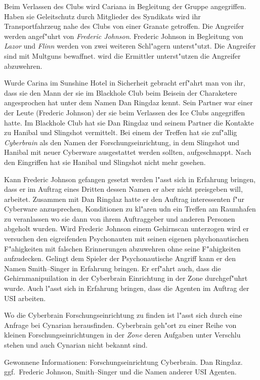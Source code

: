 Beim Verlassen des Clubs wird Cariana in Begleitung der Gruppe angegriffen. Haben sie Geleitschutz durch Mitglieder des Syndikats wird ihr Transportfahrzeug nahe des Clubs von einer Granate getroffen. Die Angreifer werden angef"uhrt von \emph{Frederic Johnson}. Frederic Johnson in Begleitung von \emph{Lazor} und \emph{Flinn} werden von zwei weiteren Schl"agern unterst"utzt. Die Angreifer sind mit Multguns bewaffnet. \xl{} wird die Ermittler unterst"utzen die Angreifer abzuwehren.

Wurde Carina im Sunshine Hotel in Sicherheit gebracht erf"ahrt man von ihr, dass sie den Mann der sie im Blackhole Club beim Beisein der Charaketere angesprochen hat unter dem Namen Dan Ringdaz kennt. Sein Partner war einer der Leute (Frederic Johnson) der sie beim Verlassen des Ice Clubs angegriffen hatte. Im Blackhole Club hat sie Dan Ringdaz und seinem Partner die Kontakte zu Hanibal und Slingshot vermittelt. Bei einem der Treffen hat sie zuf"allig \emph{Cyberbrain} als den Namen der Forschungseinrichtung, in dem Slingshot und Hanibal mit neuer Cyberware ausgestattet werden sollten, aufgeschnappt. Nach den Eingriffen hat sie Hanibal und Slingshot nicht mehr gesehen.

Kann Frederic Johnson gefangen gesetzt werden l"asst sich in Erfahrung bringen, dass er im Auftrag eines Dritten dessen Namen er aber nicht preisgeben will, arbeitet. Zusammen mit Dan Ringdaz hatte er den Auftrag interessenten f"ur Cyberware anzusprechen, Konditionen zu kl"aren udn ein Treffen am Raumhafen zu veranlassen wo sie dann von ihrem Auftraggeber und anderen Personen abgeholt wurden. Wird Frederic Johnson einem Gehirnscan unterzogen wird er versuchen den eigreifenden Psychonauten mit seinen eigenen phychonautischen F"ahigkeiten mit falschen Erinnerungen abzuwehren ohne seine F"ahigkeiten aufzudecken. Gelingt dem Spieler der Psychonautische Angriff kann er den Namen Smith--Singer in Erfahrung bringen. Er erf"ahrt auch, dass die Gehirnmanipuilation in der Cyberbrain Einrichtung in der Zone durchgef"uhrt wurde. Auch l"asst sich in Erfahrung bringen, dass die Agenten im Auftrag der USI arbeiten.

Wo die Cyberbrain Forschungseinrichtung zu finden ist l"asst sich durch eine Anfrage bei Cynarian herausfinden. Cyberbrain geh"ort zu einer Reihe von kleinen Forschungseinrichtungen in der \emph{Zone} deren Aufgaben unter Verschlu\3 stehen und auch Cynarian nicht bekannt sind.

\begin{remarks}
	Gewonnene Informationen: Forschungseinrichtung Cyberbrain. Dan Ringdaz. ggf.~Frederic Johnson, Smith--Singer und die Namen anderer USI Agenten.
\end{remarks}

